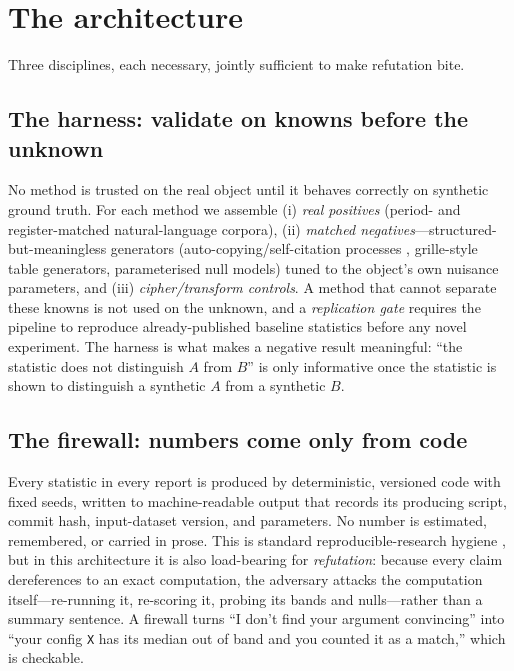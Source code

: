 \documentclass[11pt]{article}
\begin{document}
\section{The architecture}
Three disciplines, each necessary, jointly sufficient to make refutation bite.

\subsection{The harness: validate on knowns before the unknown}
No method is trusted on the real object until it behaves correctly on synthetic ground
truth. For each method we assemble (i) \emph{real positives} (period- and register-matched
natural-language corpora), (ii) \emph{matched negatives}---structured-but-meaningless
generators (auto-copying/self-citation processes \citep{timm2020selfcitation}, grille-style
table generators, parameterised null models) tuned to the object's own nuisance parameters,
and (iii) \emph{cipher/transform controls}. A method that cannot separate these knowns is
not used on the unknown, and a \emph{replication gate} requires the pipeline to reproduce
already-published baseline statistics before any novel experiment. The harness is what makes
a negative result meaningful: ``the statistic does not distinguish $A$ from $B$'' is only
informative once the statistic is shown to distinguish a synthetic $A$ from a synthetic $B$.

\subsection{The firewall: numbers come only from code}
Every statistic in every report is produced by deterministic, versioned code with fixed
seeds, written to machine-readable output that records its producing script, commit hash,
input-dataset version, and parameters. No number is estimated, remembered, or carried in
prose. This is standard reproducible-research hygiene \citep{sandve2013ten}, but in this
architecture it is also load-bearing for \emph{refutation}: because every claim dereferences
to an exact computation, the adversary attacks the computation itself---re-running it,
re-scoring it, probing its bands and nulls---rather than a summary sentence. A firewall
turns ``I don't find your argument convincing'' into ``your config \texttt{X} has its median
out of band and you counted it as a match,'' which is checkable.
\end{document}
